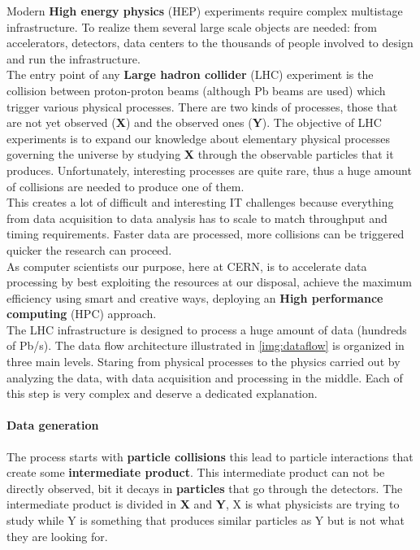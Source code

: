 Modern \textbf{High energy physics} (HEP) experiments require complex multistage infrastructure. To realize them several large scale objects are needed: from accelerators, detectors, data centers to the thousands of people involved to design and run the infrastructure.\\
The entry point of any \textbf{Large hadron collider} (LHC) experiment is the collision between proton-proton beams (although Pb beams are used) which trigger various physical processes. There are two kinds of processes, those that are not yet observed (\textbf{X}) and the observed ones (\textbf{Y}). The objective of LHC experiments is to expand our knowledge about elementary physical processes governing the universe by studying \textbf{X} through the observable particles that it produces. Unfortunately, interesting processes are quite rare, thus a huge amount of collisions are needed to produce one of them.\\
This creates a lot of difficult and interesting IT challenges because everything from data acquisition to data analysis has to scale to match throughput and timing requirements. Faster data are processed, more collisions can be triggered quicker the research can proceed.\\
As computer scientists our purpose, here at CERN, is to accelerate data processing by best exploiting the resources at our disposal, achieve the maximum efficiency using smart and creative ways, deploying an \textbf{High performance computing} (HPC) approach. \\
The LHC infrastructure is designed to process a huge amount of data (hundreds of Pb/s). The data flow architecture illustrated in \ref{img:dataflow} is organized in three main levels. Staring from physical processes to the physics carried out by analyzing the data, with data acquisition and processing in the middle. Each of this step is very complex and deserve a dedicated explanation. 
\paragraph{Data generation}
The process starts with \textbf{particle collisions} this lead to particle interactions that create some \textbf{intermediate product}. This intermediate product can not be directly observed, bit it decays in \textbf{particles} that go through the detectors. The intermediate product is divided in \textbf{X} and \textbf{Y}, X is what physicists are trying to study while Y is something that produces similar particles as Y but is not what they are looking for.

